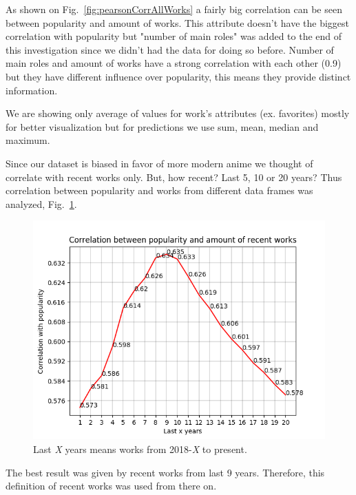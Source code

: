 As shown on Fig.~\ref{fig:pearsonCorrAllWorks} a fairly big correlation can be seen between popularity and amount of works. This attribute doesn't have the biggest correlation with popularity but "number of main roles" was added to the end of this investigation since we didn't had the data for doing so before. Number of main roles and amount of works have a strong correlation with each other (0.9) but they have different influence over popularity, this means they provide distinct information.

We are showing only average of values for work's attributes (ex. favorites) mostly for better visualization but for predictions we use sum, mean, median and maximum.

Since our dataset is biased in favor of more modern anime we thought of correlate with recent works only. But, how recent? Last 5, 10 or 20 years? Thus correlation between popularity and works from different data frames was analyzed, Fig.~\ref{fig:correlationPopRecentWorks}.

\begin{figure}[!h]
	\begin{center}
	\includegraphics[width=\columnwidth]{graphics/correlationPopRecentWorks.png}
	\caption{Last \textit{X} years means works from 2018-\textit{X} to present.}
	\label{fig:correlationPopRecentWorks}
	\end{center}
\end{figure}

The best result was given by recent works from last 9 years. Therefore, this definition of recent works was used from there on.

